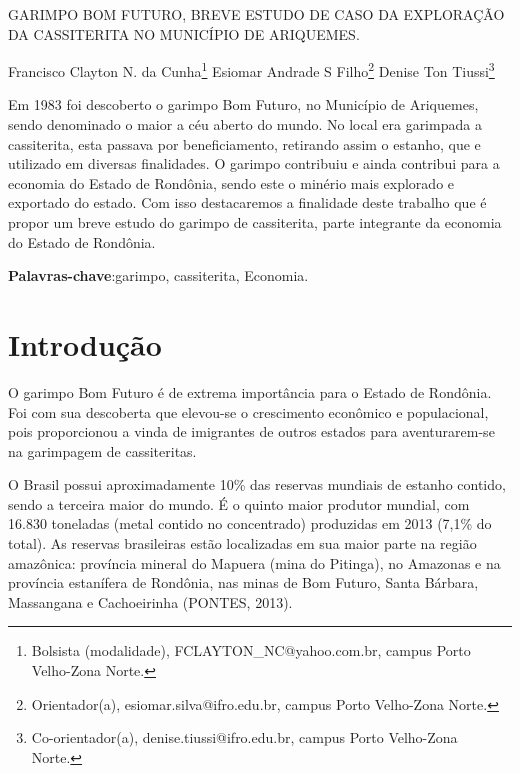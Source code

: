 \documentclass[article,12pt,onesidea,4paper,english,brazil]{abntex2}
\begin{document}
	
	
	\frenchspacing 
	
	\begin{center}
		\LARGE GARIMPO BOM FUTURO, BREVE ESTUDO DE CASO DA EXPLORAÇÃO DA CASSITERITA NO MUNICÍPIO DE ARIQUEMES.
		
		\normalsize
		Francisco Clayton N. da Cunha\footnote{Bolsista (modalidade), FCLAYTON\_NC@yahoo.com.br, campus Porto Velho-Zona Norte.} 
	Esiomar Andrade S Filho\footnote{Orientador(a), esiomar.silva@ifro.edu.br, campus Porto Velho-Zona Norte.} 
	Denise Ton Tiussi\footnote{Co-orientador(a), denise.tiussi@ifro.edu.br, campus Porto Velho-Zona Norte.}
	\end{center}
	
	\begin{resumoumacoluna}
	Em 1983 foi descoberto o garimpo Bom Futuro, no Município de Ariquemes, sendo denominado o maior a céu aberto do mundo. No local era garimpada a cassiterita, esta passava por beneficiamento, retirando assim o estanho, que e utilizado em diversas finalidades. O garimpo contribuiu e ainda contribui para a economia do Estado de Rondônia, sendo este o minério mais explorado e exportado do estado. Com isso destacaremos a finalidade deste trabalho que é propor um breve estudo do garimpo de cassiterita, parte integrante da economia do Estado de Rondônia.
	
		\vspace{\onelineskip}
		
		\noindent
		\textbf{Palavras-chave}:garimpo, cassiterita, Economia.
	\end{resumoumacoluna}
	
	\textual
	
	\section*{Introdução}
	
O garimpo Bom Futuro é de extrema importância para o Estado de Rondônia. Foi com sua descoberta que elevou-se o crescimento econômico e populacional, pois proporcionou a vinda de imigrantes de outros estados para aventurarem-se na garimpagem de cassiteritas.

O Brasil possui aproximadamente 10\% das reservas mundiais de estanho contido, sendo a terceira maior do mundo. É o quinto maior produtor mundial, com 16.830 toneladas (metal contido no concentrado) produzidas em 2013 (7,1\% do total). As reservas brasileiras estão localizadas em sua maior parte na região amazônica: província mineral do Mapuera (mina do Pitinga), no Amazonas e na província estanífera de Rondônia, nas minas de Bom Futuro, Santa Bárbara, Massangana e Cachoeirinha (PONTES, 2013).
\end{document}

